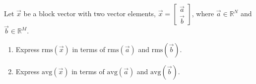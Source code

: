 \documentclass[10pt]{extarticle}
\begin{document}
\begin{problem}
[Problem 3]
Let $\vec{x}$ be a block vector with two vector elements, $\vec{x}=\begin{bmatrix}\vec{a}\\ \vec{b}\end{bmatrix}$, where $\vec{a}\in\mathbb{R}^N$ and $\vec{b}\in\mathbb{R}^M$.
\begin{enumerate}[label=(\alph*)]
\item Express $\mathrm{rms}(\vec{x})$ in terms of $\mathrm{rms}(\vec{a})$ and $\mathrm{rms}(\vec{b})$.
\item Express $\mathrm{avg}(\vec{x})$ in terms of $\mathrm{avg}(\vec{a})$ and $\mathrm{avg}(\vec{b})$.
\end{enumerate}
\end{problem}
\end{document}
